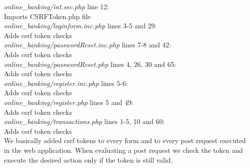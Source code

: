 \documentclass[headsepline,footsepline,footinclude=false,oneside,fontsize=11pt,paper=a4,listof=totoc,bibliography=totoc]{scrbook} %
\begin{document}
\textit{online\_banking/int.sec.php} line 12:\\
Imports CSRFToken.php file\\

\textit{online\_banking/loginform.inc.php} lines 3-5 and 29:\\
Adds csrf token checks\\

\textit{online\_banking/passwordReset.inc.php} lines 7-8 and 42:\\
Adds csrf token checks\\

\textit{online\_banking/passwordReset.php} lines 4, 26, 30 and 65:\\
Adds csrf token checks\\

\textit{online\_banking/register.inc.php} lines 5-6:\\
Adds csrf token checks\\

\textit{online\_banking/register.php} lines 5 and 49:\\
Adds csrf token checks\\

\textit{online\_banking/transactions.php} lines 1-5, 10 and 60:\\
Adds csrf token checks\\

We basically added csrf tokens to every form and to every post request executed in the web application. When evaluating a post request we check the token and execute the desired action only if the token is still valid.
\end{document}
